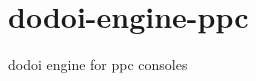 \chapter{dodoi-\/engine-\/ppc}
\hypertarget{md__r_e_a_d_m_e}{}\label{md__r_e_a_d_m_e}
\label{md__r_e_a_d_m_e_autotoc_md0}%
%
dodoi engine for ppc consoles 